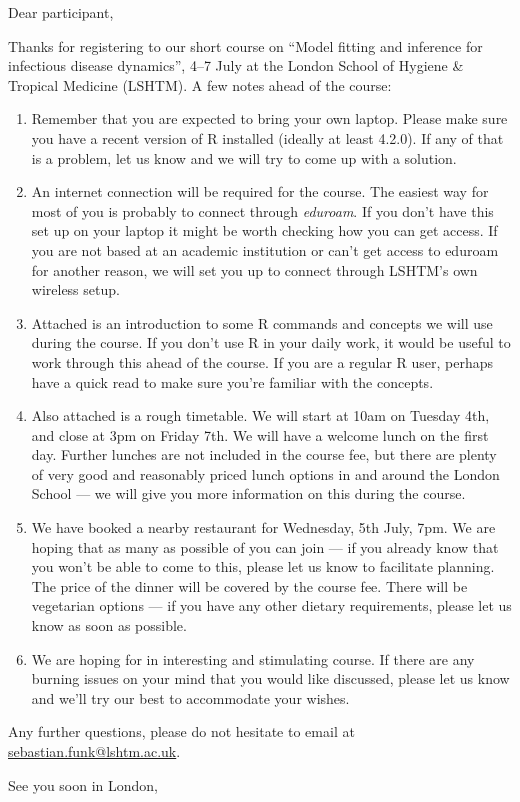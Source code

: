 \documentclass[paper=a4, 11pt]{scrlttr2}
\begin{document}
\begin{letter}{}
\opening{Dear participant,}
Thanks for registering to our short course on ``Model fitting and
inference for infectious disease dynamics'', 4--7 July at the London
School of Hygiene \& Tropical Medicine (LSHTM). A few notes ahead of
the course:

\begin{enumerate}
\item Remember that you are expected to bring your own laptop. Please make sure
you have a recent version of R installed (ideally at least 4.2.0). If any of
that is a problem, let us know and we will try to come up with a solution.
\item An internet connection will be required for the course. The easiest
way for most of you is probably to connect through \emph{eduroam}. If you
don't have this set up on your laptop it might be worth checking how you
can get access. If you are not based at an academic institution or can't
get access to eduroam for another reason, we will set you up to connect
through LSHTM's own wireless setup.
\item Attached is an introduction to some R commands and concepts we will use
during the course. If you don't use R in your daily work, it would be useful to
work through this ahead of the course. If you are a regular R user, perhaps have
a quick read to make sure you're familiar with the concepts.
\item Also attached is a rough timetable. We will start at 10am on Tuesday 4th,
and close at 3pm on Friday 7th. We will have a welcome lunch on the first day.
Further lunches are not included in the course fee, but there are plenty of very
good and reasonably priced lunch options in and around the London School --- we
will give you more information on this during the course.
\item We have booked a nearby restaurant for Wednesday, 5th July, 7pm. We are
hoping that as many as possible of you can join --- if you already know that you
won't be able to come to this, please let us know to facilitate planning. The
price of the dinner will be covered by the course fee. There will be vegetarian
options --- if you have any other dietary requirements, please let us know as
soon as possible.
\item We are hoping for in interesting and stimulating course. If there are
any burning issues on your mind that you would like discussed, please
let us know and we'll try our best to accommodate your wishes.
\end{enumerate}
Any further questions, please do not hesitate to email
at \href{mailto:sebastian.funk@lshtm.ac.uk}{sebastian.funk@lshtm.ac.uk}.

\closing{See you soon in London,}
\end{letter}
\end{document}
